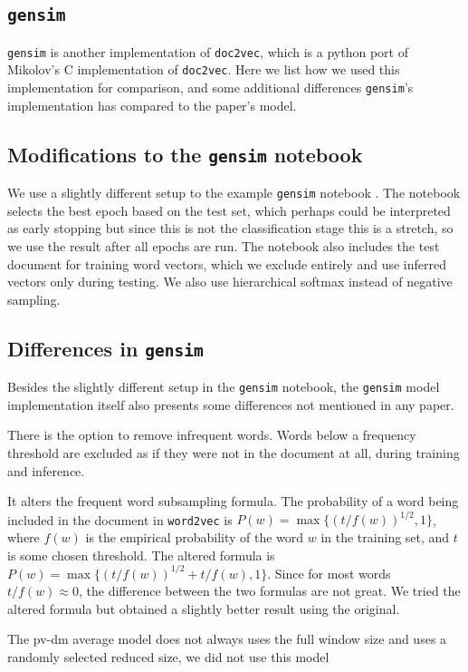 \documentclass{article}
\begin{document}
\begin{appendices}
\section{\texttt{gensim}} \label{sec:gensim}
\texttt{gensim} is another implementation of \texttt{doc2vec}, which is a python port of Mikolov's C implementation of \texttt{doc2vec}. Here we list how we used this implementation for comparison, and some additional differences \texttt{gensim}'s implementation has compared to the paper's model.

\subsection{Modifications to the \texttt{gensim} notebook}
We use a slightly different setup to the example \texttt{gensim} notebook \citep{mohr_gensim_2017}. The notebook selects the best epoch based on the test set, which perhaps could be interpreted as early stopping but since this is not the classification stage this is a stretch, so we use the result after all epochs are run. The notebook also includes the test document for training word vectors, which we exclude entirely and use inferred vectors only during testing. We also use hierarchical softmax instead of negative sampling.

\subsection{Differences in \texttt{gensim}}
Besides the slightly different setup in the \texttt{gensim} notebook, the \texttt{gensim} model implementation itself also presents some differences not mentioned in any paper.

There is the option to remove infrequent words. Words below a frequency threshold are excluded as if they were not in the document at all, during training and inference.

It alters the frequent word subsampling formula. The probability of a word being included in the document in \texttt{word2vec} is $P(w)=\max\{(t/f(w))^{1/2}, 1\}$, where $f(w)$ is the empirical probability of the word ${w}$ in the training set, and $t$ is some chosen threshold. The altered formula is $P(w)=\max\{(t/f(w))^{1/2} + {t/f(w)}, 1\}$. Since for most words $t/f(w)\approx 0$, the difference between the two formulas are not great. We tried the altered formula but obtained a slightly better result using the original.

The pv-dm average model does not always uses the full window size and uses a randomly selected reduced size, we did not use this model


\end{appendices}
\end{document}
